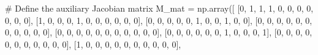 \documentclass[
  letterpaper,
  DIV=11,
  numbers=noendperiod]{scrreprt}
\newenvironment{Shaded}{\begin{snugshade}}{\end{snugshade}}
\newcommand{\CommentTok}[1]{\textcolor[rgb]{0.37,0.37,0.37}{#1}}
\newcommand{\DecValTok}[1]{\textcolor[rgb]{0.68,0.00,0.00}{#1}}
\newcommand{\NormalTok}[1]{\textcolor[rgb]{0.00,0.23,0.31}{#1}}
\newcommand{\OperatorTok}[1]{\textcolor[rgb]{0.37,0.37,0.37}{#1}}
\begin{document}
\begin{tcolorbox}
\begin{Shaded}
\begin{Highlighting}[]
\CommentTok{\# Define the auxiliary Jacobian matrix}
\NormalTok{M\_mat }\OperatorTok{=}\NormalTok{ np.array([}
\NormalTok{    [}\DecValTok{0}\NormalTok{, }\DecValTok{1}\NormalTok{, }\DecValTok{1}\NormalTok{, }\DecValTok{1}\NormalTok{, }\DecValTok{0}\NormalTok{, }\DecValTok{0}\NormalTok{, }\DecValTok{0}\NormalTok{, }\DecValTok{0}\NormalTok{, }\DecValTok{0}\NormalTok{, }\DecValTok{0}\NormalTok{, }\DecValTok{0}\NormalTok{],}
\NormalTok{    [}\DecValTok{1}\NormalTok{, }\DecValTok{0}\NormalTok{, }\DecValTok{0}\NormalTok{, }\DecValTok{0}\NormalTok{, }\DecValTok{1}\NormalTok{, }\DecValTok{0}\NormalTok{, }\DecValTok{0}\NormalTok{, }\DecValTok{0}\NormalTok{, }\DecValTok{0}\NormalTok{, }\DecValTok{0}\NormalTok{, }\DecValTok{0}\NormalTok{],}
\NormalTok{    [}\DecValTok{0}\NormalTok{, }\DecValTok{0}\NormalTok{, }\DecValTok{0}\NormalTok{, }\DecValTok{0}\NormalTok{, }\DecValTok{0}\NormalTok{, }\DecValTok{1}\NormalTok{, }\DecValTok{0}\NormalTok{, }\DecValTok{0}\NormalTok{, }\DecValTok{1}\NormalTok{, }\DecValTok{0}\NormalTok{, }\DecValTok{0}\NormalTok{],}
\NormalTok{    [}\DecValTok{0}\NormalTok{, }\DecValTok{0}\NormalTok{, }\DecValTok{0}\NormalTok{, }\DecValTok{0}\NormalTok{, }\DecValTok{0}\NormalTok{, }\DecValTok{0}\NormalTok{, }\DecValTok{0}\NormalTok{, }\DecValTok{0}\NormalTok{, }\DecValTok{0}\NormalTok{, }\DecValTok{0}\NormalTok{, }\DecValTok{0}\NormalTok{],}
\NormalTok{    [}\DecValTok{0}\NormalTok{, }\DecValTok{0}\NormalTok{, }\DecValTok{0}\NormalTok{, }\DecValTok{0}\NormalTok{, }\DecValTok{0}\NormalTok{, }\DecValTok{0}\NormalTok{, }\DecValTok{0}\NormalTok{, }\DecValTok{0}\NormalTok{, }\DecValTok{0}\NormalTok{, }\DecValTok{0}\NormalTok{, }\DecValTok{0}\NormalTok{],}
\NormalTok{    [}\DecValTok{0}\NormalTok{, }\DecValTok{0}\NormalTok{, }\DecValTok{0}\NormalTok{, }\DecValTok{0}\NormalTok{, }\DecValTok{0}\NormalTok{, }\DecValTok{0}\NormalTok{, }\DecValTok{1}\NormalTok{, }\DecValTok{0}\NormalTok{, }\DecValTok{0}\NormalTok{, }\DecValTok{0}\NormalTok{, }\DecValTok{1}\NormalTok{],}
\NormalTok{    [}\DecValTok{0}\NormalTok{, }\DecValTok{0}\NormalTok{, }\DecValTok{0}\NormalTok{, }\DecValTok{0}\NormalTok{, }\DecValTok{0}\NormalTok{, }\DecValTok{0}\NormalTok{, }\DecValTok{0}\NormalTok{, }\DecValTok{0}\NormalTok{, }\DecValTok{0}\NormalTok{, }\DecValTok{0}\NormalTok{, }\DecValTok{0}\NormalTok{],}
\NormalTok{    [}\DecValTok{1}\NormalTok{, }\DecValTok{0}\NormalTok{, }\DecValTok{0}\NormalTok{, }\DecValTok{0}\NormalTok{, }\DecValTok{0}\NormalTok{, }\DecValTok{0}\NormalTok{, }\DecValTok{0}\NormalTok{, }\DecValTok{0}\NormalTok{, }\DecValTok{0}\NormalTok{, }\DecValTok{0}\NormalTok{, }\DecValTok{0}\NormalTok{],}

\end{Highlighting}
\end{Shaded}
\end{tcolorbox}
\end{document}
